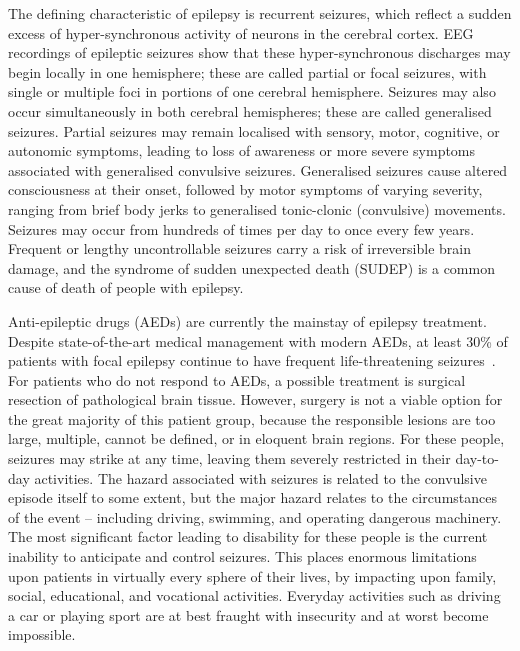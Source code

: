 \documentclass[]{article}
\begin{document}
The defining characteristic of epilepsy is recurrent seizures, which reflect a sudden excess of hyper-synchronous activity of neurons in the cerebral cortex. EEG recordings of epileptic seizures show that these hyper-synchronous discharges may begin locally in one hemisphere; these are called partial or focal seizures, with single or multiple foci in portions of one cerebral hemisphere. Seizures may also occur simultaneously in both cerebral hemispheres; these are called generalised seizures. Partial seizures may remain localised with sensory, motor, cognitive, or autonomic symptoms, leading to loss of awareness or more severe symptoms associated with generalised convulsive seizures. Generalised seizures cause altered consciousness at their onset, followed by motor symptoms of varying severity, ranging from brief body jerks to generalised tonic-clonic (convulsive) movements. Seizures may occur from hundreds of times per day to once every few years. Frequent or lengthy uncontrollable seizures carry a risk of irreversible brain damage, and the syndrome of sudden unexpected death (SUDEP) is a common cause of death of people with epilepsy.

Anti-epileptic drugs (AEDs) are currently the mainstay of epilepsy treatment. Despite state-of-the-art medical management with modern AEDs, at least 30\% of patients with focal epilepsy continue to have frequent life-threatening seizures~\cite{Schmidt2005}. For patients who do not respond to AEDs, a possible treatment is surgical resection of pathological brain tissue.  However, surgery is not a viable option for the great majority of this patient group, because the responsible lesions are too large, multiple, cannot be defined, or in eloquent brain regions. For these people, seizures may strike at any time, leaving them severely restricted in their day-to-day activities. The hazard associated with seizures is related to the convulsive episode itself to some extent, but the major hazard relates to the circumstances of the event – including driving, swimming, and operating dangerous machinery. The most significant factor leading to disability for these people is the current inability to anticipate and control seizures. This places enormous limitations upon patients in virtually every sphere of their lives, by impacting upon family, social, educational, and vocational activities. Everyday activities such as driving a car or playing sport are at best fraught with insecurity and at worst become impossible.
\end{document}

